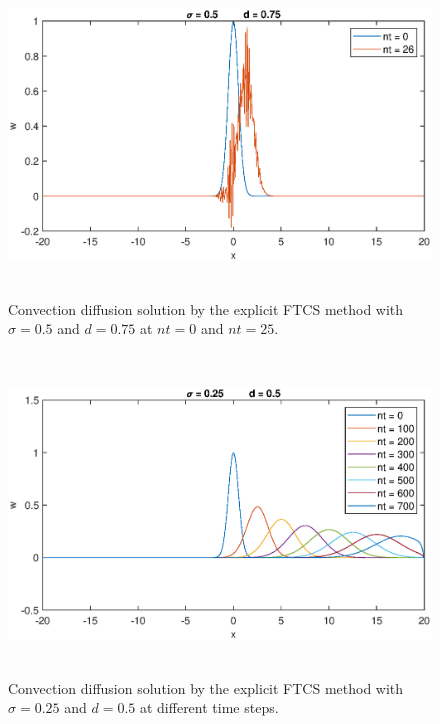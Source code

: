 \documentclass[letterpaper,12pt]{article}
\begin{document}
\newpage
\begin{figure}[!ht] 
	\centering 
	\includegraphics[max height=8.5cm]{graphs/FTCS/ConvectionDiffusion/sigma05d075.eps}
	\caption{Convection diffusion solution by the explicit FTCS method with $\sigma= 0.5$ and $d=0.75$ at $nt=0$ and $nt=25$.}
	 \label{fig:FTCSsigma05d075}
\end{figure}
\begin{figure}[!ht] 
	\centering 
	\includegraphics[max height=8.5cm]{graphs/FTCS/ConvectionDiffusion/sigma025d05.eps}
	\caption{Convection diffusion solution by the explicit FTCS method with $\sigma= 0.25$ and $d=0.5$ at different time steps.}
	 \label{fig:FTCSsigma025d05}
\end{figure}
\newpage
\end{document}
